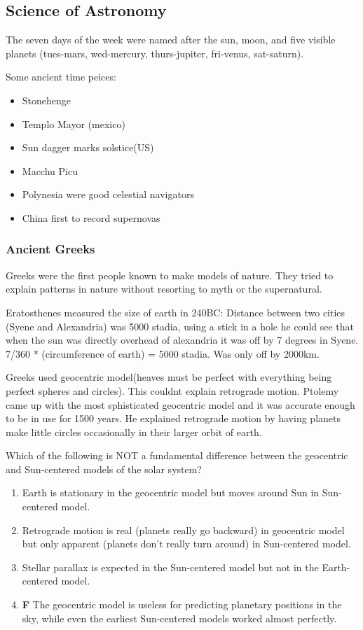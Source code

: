 \subsection{Science of Astronomy}
The seven days of the week were named after the sun, moon, and five visible planets (tues-mars, wed-mercury, thurs-jupiter, fri-venus, sat-saturn).

Some ancient time peices:
\begin{itemize}
\item Stonehenge
\item Templo Mayor (mexico)
\item Sun dagger marks solstice(US)
\item Macchu Picu
\item Polynesia were good celestial navigators
\item China first to record supernovas
\end{itemize}

\subsubsection{Ancient Greeks}
Greeks were the first people known to make models of nature. They tried to explain patterns in nature without resorting to myth or the supernatural.

Eratosthenes measured the size of earth in 240BC: Distance between two cities (Syene and Alexandria) was 5000 stadia, using a stick in a hole he could see that when the sun was directly overhead of alexandria it was off by 7 degrees in Syene. 7/360 * (circumference of earth) = 5000 stadia. Was only off by 2000km.

Greeks used geocentric model(heaves must be perfect with everything being perfect spheres and circles). This couldnt explain retrograde motion. Ptolemy came up with the most sphisticated geocentric model and it was accurate enough to be in use for 1500 years. He explained retrograde motion by having planets make little circles occasionally in their larger orbit of earth.

Which of the following is NOT a fundamental difference between the geocentric and Sun-centered models of the  solar system?
\begin{enumerate}
\item Earth is stationary in the geocentric model but moves around Sun in Sun-centered model.
\item Retrograde motion is real (planets really go backward) in geocentric model but only apparent (planets don't really turn around) in Sun-centered model.
\item Stellar parallax is expected in the Sun-centered model but not in the Earth-centered model.
\item \textbf{F} The geocentric model is useless for predicting planetary positions in the sky, while even the earliest Sun-centered models worked almost perfectly.
\end{enumerate}

